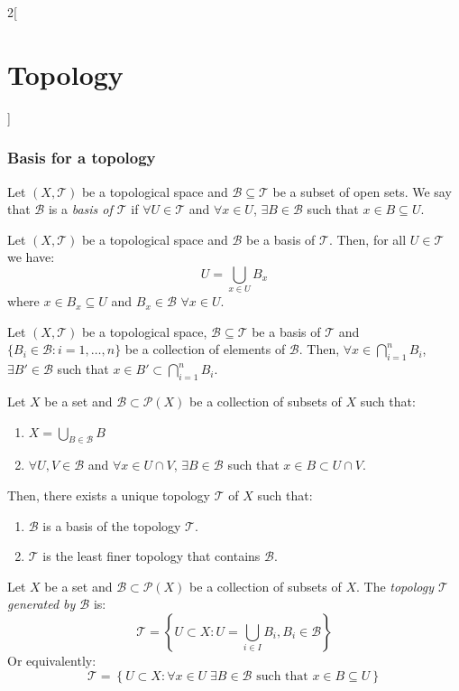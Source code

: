 \documentclass[../../../main.tex]{subfiles}
\begin{document}
\begin{multicols}{2}[\section{Topology}]
  \subsubsection{Basis for a topology}
  \begin{definition}
    Let $(X,\mathcal{T})$ be a topological space and $\mathcal{B}\subseteq\mathcal{T}$ be a subset of open sets. We say that $\mathcal{B}$ is a \textit{basis of $\mathcal{T}$} if $\forall U\in\mathcal{T}$ and $\forall x\in U$, $\exists B\in\mathcal{B}$ such that $x\in B\subseteq U$.
  \end{definition}
  \begin{prop}
    Let $(X,\mathcal{T})$ be a topological space and $\mathcal{B}$ be a basis of $\mathcal{T}$. Then, for all $U\in\mathcal{T}$ we have: $$U=\bigcup_{x\in U}B_x$$ where $x\in B_x\subseteq U$ and $B_x\in\mathcal{B}$ $\forall x\in U$.
  \end{prop}
  \begin{lemma}
    Let $(X,\mathcal{T})$ be a topological space, $\mathcal{B}\subseteq\mathcal{T}$ be a basis of $\mathcal{T}$ and $\{B_i\in\mathcal{B}:i=1,\ldots,n\}$ be a collection of elements of $\mathcal{B}$. Then, $\forall x\in\bigcap_{i=1}^nB_i$, $\exists B'\in\mathcal{B}$ such that $x\in B'\subset\bigcap_{i=1}^nB_i$.
  \end{lemma}
  \begin{prop}
    Let $X$ be a set and $\mathcal{B}\subset\mathcal{P}(X)$ be a collection of subsets of $X$ such that:
    \begin{enumerate}
      \renewcommand{\labelenumi}{\alph{enumi})}
      \item $\displaystyle X=\bigcup_{B\in\mathcal{B}} B$
      \item $\forall U,V\in\mathcal{B}$ and  $\forall x\in U\cap V$, $\exists B\in\mathcal{B}$ such that $x\in B\subset U\cap V$.
    \end{enumerate}
    Then, there exists a unique topology $\mathcal{T}$ of $X$ such that:
    \begin{enumerate}
      \item $\mathcal{B}$ is a basis of the topology $\mathcal{T}$.
      \item $\mathcal{T}$ is the least finer topology that contains $\mathcal{B}$.
    \end{enumerate}
  \end{prop}
  \begin{definition}
    Let $X$ be a set and $\mathcal{B}\subset\mathcal{P}(X)$ be a collection of subsets of $X$. The \textit{topology $\mathcal{T}$ generated by $\mathcal{B}$} is: $$\mathcal{T}=\left\{U\subset X:U=\bigcup_{i\in I}B_i, B_i\in \mathcal{B}\right\}$$ Or equivalently: $$\mathcal{T}=\left\{U\subset X:\forall x\in U\;\exists B\in\mathcal{B}\text{ such that }x\in B\subseteq U\right\}$$

\end{definition}
\end{multicols}
\end{document}
